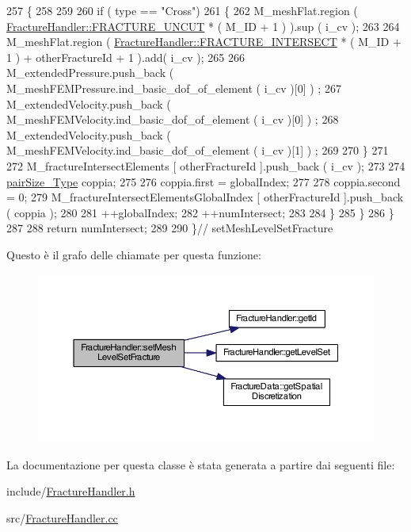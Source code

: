 \begin{DoxyCode}
257             \{  
258 
259  
260                 \textcolor{keywordflow}{if} ( type == \textcolor{stringliteral}{"Cross"})
261                 \{   
262                     M\_meshFlat.region ( \hyperlink{classFractureHandler_a495ad4fc72d0c47c8f0424842f1153aaaa992cc3ad024a030ecd798dc319c95ac}{FractureHandler::FRACTURE\_UNCUT} * ( 
      M\_ID + 1 ) ).sup ( i\_cv );
263                     
264                     M\_meshFlat.region ( \hyperlink{classFractureHandler_a495ad4fc72d0c47c8f0424842f1153aaa781cae3f3b99bf9357fed2833d315537}{FractureHandler::FRACTURE\_INTERSECT}
       * ( M\_ID + 1 ) + otherFractureId + 1 ).add( i\_cv );
265     
266                     M\_extendedPressure.push\_back ( M\_meshFEMPressure.ind\_basic\_dof\_of\_element ( i\_cv )[0] )
      ;
267                     M\_extendedVelocity.push\_back ( M\_meshFEMVelocity.ind\_basic\_dof\_of\_element ( i\_cv )[0] )
      ;
268                     M\_extendedVelocity.push\_back ( M\_meshFEMVelocity.ind\_basic\_dof\_of\_element ( i\_cv )[1] )
      ;
269                     
270                 \}
271                 
272                 M\_fractureIntersectElements [ otherFractureId ].push\_back ( i\_cv );
273 
274                 \hyperlink{Core_8h_a6453867d4e9bd858ad9577b4a1078511}{pairSize\_Type} coppia;
275 
276                 coppia.first = globalIndex;
277 
278                 coppia.second = 0;
279                 M\_fractureIntersectElementsGlobalIndex [ otherFractureId ].push\_back ( coppia );
280 
281                 ++globalIndex;
282                 ++numIntersect;
283            
284                 \}
285         \}
286     \}
287 
288     \textcolor{keywordflow}{return} numIntersect;
289     
290 \}\textcolor{comment}{// setMeshLevelSetFracture}
\end{DoxyCode}


Questo è il grafo delle chiamate per questa funzione\-:\nopagebreak
\begin{figure}[H]
\begin{center}
\leavevmode
\includegraphics[width=350pt]{classFractureHandler_ac8cefb4c4416edc814345eb2475c8e37_cgraph}
\end{center}
\end{figure}




La documentazione per questa classe è stata generata a partire dai seguenti file\-:\begin{DoxyCompactItemize}
\item 
include/\hyperlink{FractureHandler_8h}{Fracture\-Handler.\-h}\item 
src/\hyperlink{FractureHandler_8cc}{Fracture\-Handler.\-cc}\end{DoxyCompactItemize}
